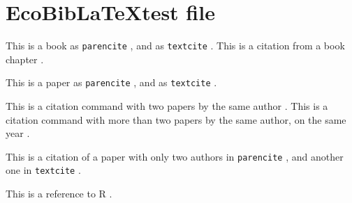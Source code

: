 \documentclass[11pt]{article}
\begin{document}
 
\section*{EcoBib\LaTeX test file}

This is a book as \texttt{parencite} \parencite{Darwin1859}, and as \texttt{textcite}
\textcite{Elton1927}. This is a citation from a book chapter \parencite{Dunne2006}.

This is a paper as \texttt{parencite} \parencite{Holt1996}, and as \texttt{textcite}
\textcite{Anderson2011}.

This is a citation command with two papers by the same author \parencite{Tuomisto2010,Tuomisto2011}.
This is a citation command with more than two papers by the same author, on the same year
\parencite{Frank1993,Frank1993a,Frank1993b}.

This is a citation of a paper with only two authors in \texttt{parencite}
\parencite{PoisotBJLS2010}, and another one in \texttt{textcite} \textcite{Yang2012}.

This is a reference to R \parencite{R-Development-Core-Team2008}.

\printbibliography
\end{document}

